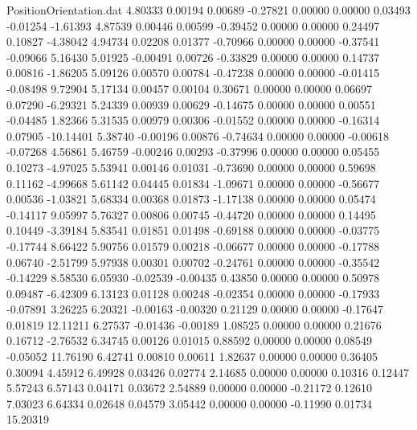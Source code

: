 \begin{filecontents}{PositionOrientation.dat}
   4.80333    0.00194    0.00689    -0.27821    0.00000    0.00000    0.03493   -0.01254   -1.61393
   4.87539    0.00446    0.00599    -0.39452    0.00000    0.00000    0.24497    0.10827   -4.38042
   4.94734    0.02208    0.01377    -0.70966    0.00000    0.00000   -0.37541   -0.09066    5.16430
   5.01925   -0.00491    0.00726    -0.33829    0.00000    0.00000    0.14737    0.00816   -1.86205
   5.09126    0.00570    0.00784    -0.47238    0.00000    0.00000   -0.01415   -0.08498    9.72904
   5.17134    0.00457    0.00104     0.30671    0.00000    0.00000    0.06697    0.07290   -6.29321
   5.24339    0.00939    0.00629    -0.14675    0.00000    0.00000    0.00551   -0.04485    1.82366
   5.31535    0.00979    0.00306    -0.01552    0.00000    0.00000   -0.16314    0.07905  -10.14401
   5.38740   -0.00196    0.00876    -0.74634    0.00000    0.00000   -0.00618   -0.07268    4.56861
   5.46759   -0.00246    0.00293    -0.37996    0.00000    0.00000    0.05455    0.10273   -4.97025
   5.53941    0.00146    0.01031    -0.73690    0.00000    0.00000    0.59698    0.11162   -4.99668
   5.61142    0.04445    0.01834    -1.09671    0.00000    0.00000   -0.56677    0.00536   -1.03821
   5.68334    0.00368    0.01873    -1.17138    0.00000    0.00000    0.05474   -0.14117    9.05997
   5.76327    0.00806    0.00745    -0.44720    0.00000    0.00000    0.14495    0.10449   -3.39184
   5.83541    0.01851    0.01498    -0.69188    0.00000    0.00000   -0.03775   -0.17744    8.66422
   5.90756    0.01579    0.00218    -0.06677    0.00000    0.00000   -0.17788    0.06740   -2.51799
   5.97938    0.00301    0.00702    -0.24761    0.00000    0.00000   -0.35542   -0.14229    8.58530
   6.05930   -0.02539   -0.00435     0.43850    0.00000    0.00000    0.50978    0.09487   -6.42309
   6.13123    0.01128    0.00248    -0.02354    0.00000    0.00000   -0.17933   -0.07891    3.26225
   6.20321   -0.00163   -0.00320     0.21129    0.00000    0.00000   -0.17647    0.01819   12.11211
   6.27537   -0.01436   -0.00189     1.08525    0.00000    0.00000    0.21676    0.16712   -2.76532
   6.34745    0.00126    0.01015     0.88592    0.00000    0.00000    0.08549   -0.05052   11.76190
   6.42741    0.00810    0.00611     1.82637    0.00000    0.00000    0.36405    0.30094    4.45912
   6.49928    0.03426    0.02774     2.14685    0.00000    0.00000    0.10316    0.12447    5.57243
   6.57143    0.04171    0.03672     2.54889    0.00000    0.00000   -0.21172    0.12610    7.03023
   6.64334    0.02648    0.04579     3.05442    0.00000    0.00000   -0.11990    0.01734   15.20319

\end{filecontents}

